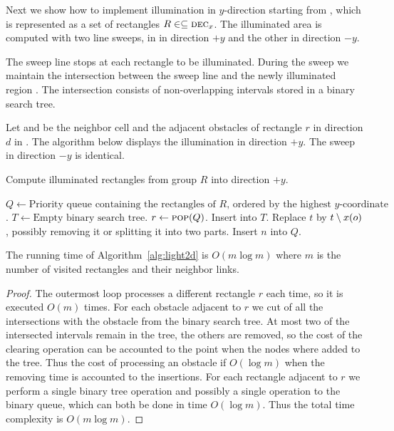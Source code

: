 \documentclass[english,gradu]{tktltiki2018}
\begin{document}
Next we show how to implement illumination in $y$-direction starting from , which is represented as a set of rectangles $R\in\subseteq\textsc{dec}_{x}$.
The illuminated area is computed with two line sweeps, in in direction $+y$ and the other in direction $-y$.

The sweep line stops at each rectangle to be illuminated.
During the sweep we maintain the intersection between the sweep line and the newly illuminated region .
The intersection consists of non-overlapping intervals stored in a binary search tree.

Let  and  be the neighbor cell and the adjacent obstacles of rectangle $r$ in direction $d$ in .
The algorithm below displays the illumination in direction $+y$.
The sweep in direction $-y$ is identical.

\begin{alg}\label{alg:light2d}
Compute illuminated rectangles from group $R$ into direction $+y$.
\begin{algorithmic}
\State $Q\gets\text{Priority queue containing the rectangles of $R$, ordered by the highest $y$-coordinate}$.
\State $T\gets\text{Empty binary search tree}$.
	\State $r\gets\textsc{pop}(Q)$.
		\State Insert  into $T$.
	\EndIf
			\State Replace $t$ by $t\setminus x(o)$, possibly removing it or splitting it into two parts.
		\EndFor
	\EndFor
			\State Insert $n$ into $Q$.
		\EndIf
	\EndFor
\EndWhile
\end{algorithmic}
\end{alg}

\begin{lem}\label{lem:light2dtime}The running time of Algorithm~\ref{alg:light2d} is $O(m\log m)$ where $m$ is the number of visited rectangles and their neighbor links.\end{lem}
\begin{proof}
The outermost loop processes a different rectangle $r$ each time, so it is executed $O(m)$ times.
For each obstacle adjacent to $r$ we cut of all the intersections with the obstacle from the binary search tree.
At most two of the intersected intervals remain in the tree, the others are removed, so the cost of the clearing operation can be accounted to the point when the nodes where added to the tree.
Thus the cost of processing an obstacle if $O(\log m)$ when the removing time is accounted to the insertions.
For each rectangle adjacent to $r$ we perform a single binary tree operation and possibly a single operation to the binary queue, which can both be done in time $O(\log m)$.
Thus the total time complexity is $O(m\log m)$.
\end{proof}
\end{document}
